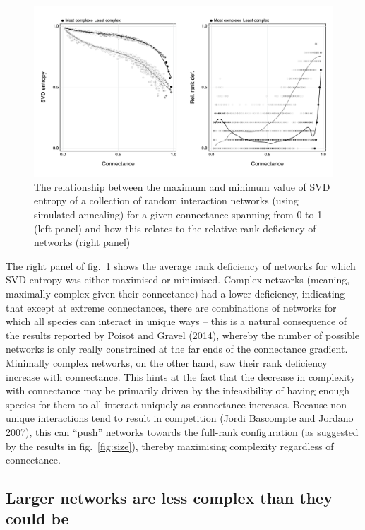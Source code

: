 \documentclass[11pt]{article}
\makeatletter
\def\maxwidth{\ifdim\Gin@nat@width>\linewidth\linewidth
\else\Gin@nat@width\fi}
\let\Oldincludegraphics\includegraphics
\renewcommand{\includegraphics}[1]{\Oldincludegraphics[width=\maxwidth]{#1}}
\makeatother
\begin{document}
\begin{figure}
\hypertarget{fig:simann}{%
\centering
\includegraphics{figures/minmax_combined.png}
\caption{The relationship between the maximum and minimum value of SVD
entropy of a collection of random interaction networks (using simulated
annealing) for a given connectance spanning from 0 to 1 (left panel) and
how this relates to the relative rank deficiency of networks (right
panel)}\label{fig:simann}
}
\end{figure}

The right panel of fig.~\ref{fig:simann} shows the average rank
deficiency of networks for which SVD entropy was either maximised or
minimised. Complex networks (meaning, maximally complex given their
connectance) had a lower deficiency, indicating that except at extreme
connectances, there are combinations of networks for which all species
can interact in unique ways -- this is a natural consequence of the
results reported by Poisot and Gravel (2014), whereby the number of
possible networks is only really constrained at the far ends of the
connectance gradient. Minimally complex networks, on the other hand, saw
their rank deficiency increase with connectance. This hints at the fact
that the decrease in complexity with connectance may be primarily driven
by the infeasibility of having enough species for them to all interact
uniquely as connectance increases. Because non-unique interactions tend
to result in competition (Jordi Bascompte and Jordano 2007), this can
``push'' networks towards the full-rank configuration (as suggested by
the results in fig.~\ref{fig:size}), thereby maximising complexity
regardless of connectance.

\hypertarget{larger-networks-are-less-complex-than-they-could-be}{%
\subsection{Larger networks are less complex than they could
be}\label{larger-networks-are-less-complex-than-they-could-be}}
\end{document}
